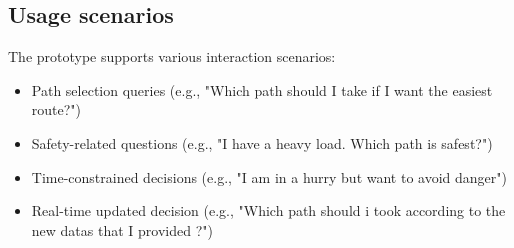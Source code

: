 \subsection{Usage scenarios}

The prototype supports various interaction scenarios:
\begin{itemize}
    \item Path selection queries (e.g., "Which path should I take if I want the easiest route?")
    \item Safety-related questions (e.g., "I have a heavy load. Which path is safest?")
    \item Time-constrained decisions (e.g., "I am in a hurry but want to avoid danger")
    \item Real-time updated decision (e.g., "Which path should i took according to the new datas that I provided ?")
\end{itemize}
